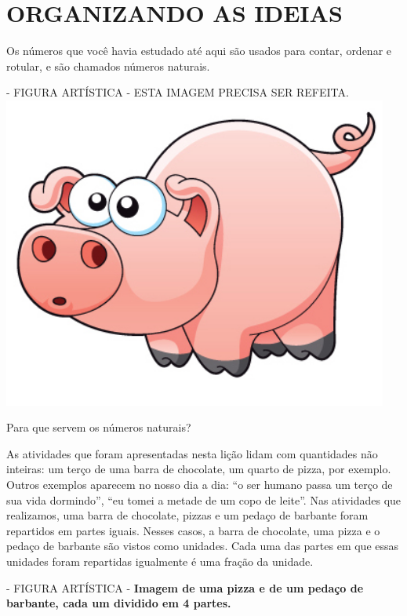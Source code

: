 \documentclass[a4,12pt]{book}
\newcounter{atividade}
\begin{document}
\section*{ ORGANIZANDO AS IDEIAS }





Os números que você havia estudado até aqui são usados para contar, ordenar e rotular, e são chamados números naturais.
\begin{imagem*}[breakable]{}{}   - FIGURA ARTÍSTICA - ESTA IMAGEM PRECISA SER REFEITA.
    \includegraphics[width=360pt, keepaspectratio]{pig}
\end{imagem*}

Para que servem os números naturais?

As atividades que foram apresentadas nesta lição lidam com quantidades não inteiras: um terço de uma barra de chocolate, um quarto de pizza, por exemplo.
Outros exemplos aparecem no nosso dia a dia: ``o ser humano passa um terço de sua vida dormindo'', ``eu tomei a metade de um copo de leite''.
Nas atividades que realizamos, uma barra de chocolate, pizzas e um pedaço de barbante foram repartidos em partes iguais.
Nesses casos, a barra de chocolate, uma pizza e o pedaço de barbante são vistos como unidades.
Cada uma das partes em que essas unidades foram repartidas igualmente é uma fração da unidade.

\begin{imagem*}[breakable]{}{}   - FIGURA ARTÍSTICA -
  {\bf Imagem de uma pizza e de um pedaço de barbante, cada um dividido em 4 partes.}
\end{imagem*}
\end{document}
